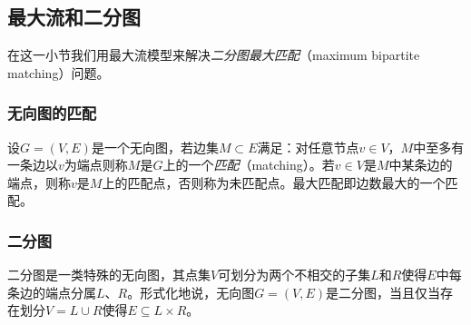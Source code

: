 \documentclass[a4paper]{ctexbook}
\begin{document}
  \subsection{最大流和二分图}
  在这一小节我们用最大流模型来解决\emph{二分图最大匹配}（maximum bipartite matching）问题。
  \subsubsection*{无向图的匹配}
  设$G=(V,E)$是一个无向图，若边集$M\subset E$满足：对任意节点$v\in V$，$M$中至多有一条边以$v$为端点则称$M$是$G$上的一个\emph{匹配}（matching）。若$v\in V$是$M$中某条边的端点，则称$v$是$M$上的匹配点，否则称为未匹配点。最大匹配即边数最大的一个匹配。
  \subsubsection*{二分图}
  二分图是一类特殊的无向图，其点集$V$可划分为两个不相交的子集$L$和$R$使得$E$中每条边的端点分属$L$、$R$。形式化地说，无向图$G=(V,E)$是二分图，当且仅当存在划分$V=L\cup R$使得$E\subseteq L\times R$。
\end{document}
